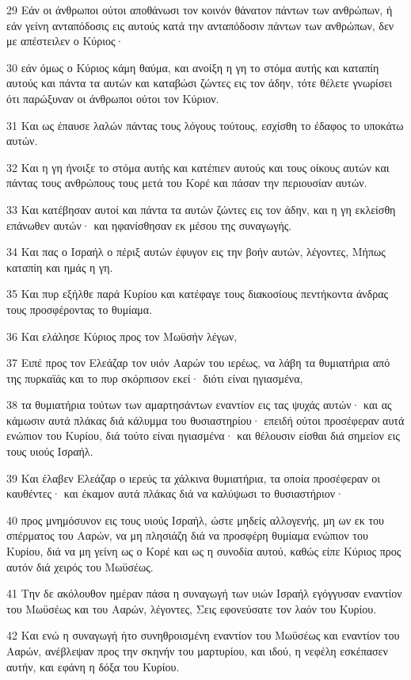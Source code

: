 \par 29 Εάν οι άνθρωποι ούτοι αποθάνωσι τον κοινόν θάνατον πάντων των ανθρώπων, ή εάν γείνη ανταπόδοσις εις αυτούς κατά την ανταπόδοσιν πάντων των ανθρώπων, δεν με απέστειλεν ο Κύριος·
\par 30 εάν όμως ο Κύριος κάμη θαύμα, και ανοίξη η γη το στόμα αυτής και καταπίη αυτούς και πάντα τα αυτών και καταβώσι ζώντες εις τον άδην, τότε θέλετε γνωρίσει ότι παρώξυναν οι άνθρωποι ούτοι τον Κύριον.
\par 31 Και ως έπαυσε λαλών πάντας τους λόγους τούτους, εσχίσθη το έδαφος το υποκάτω αυτών.
\par 32 Και η γη ήνοιξε το στόμα αυτής και κατέπιεν αυτούς και τους οίκους αυτών και πάντας τους ανθρώπους τους μετά του Κορέ και πάσαν την περιουσίαν αυτών.
\par 33 Και κατέβησαν αυτοί και πάντα τα αυτών ζώντες εις τον άδην, και η γη εκλείσθη επάνωθεν αυτών· και ηφανίσθησαν εκ μέσου της συναγωγής.
\par 34 Και πας ο Ισραήλ ο πέριξ αυτών έφυγον εις την βοήν αυτών, λέγοντες, Μήπως καταπίη και ημάς η γη.
\par 35 Και πυρ εξήλθε παρά Κυρίου και κατέφαγε τους διακοσίους πεντήκοντα άνδρας τους προσφέροντας το θυμίαμα.
\par 36 Και ελάλησε Κύριος προς τον Μωϋσήν λέγων,
\par 37 Ειπέ προς τον Ελεάζαρ τον υιόν Ααρών του ιερέως, να λάβη τα θυμιατήρια από της πυρκαϊάς και το πυρ σκόρπισον εκεί· διότι είναι ηγιασμένα,
\par 38 τα θυμιατήρια τούτων των αμαρτησάντων εναντίον εις τας ψυχάς αυτών· και ας κάμωσιν αυτά πλάκας διά κάλυμμα του θυσιαστηρίου· επειδή ούτοι προσέφεραν αυτά ενώπιον του Κυρίου, διά τούτο είναι ηγιασμένα· και θέλουσιν είσθαι διά σημείον εις τους υιούς Ισραήλ.
\par 39 Και έλαβεν Ελεάζαρ ο ιερεύς τα χάλκινα θυμιατήρια, τα οποία προσέφεραν οι καυθέντες· και έκαμον αυτά πλάκας διά να καλύψωσι το θυσιαστήριον·
\par 40 προς μνημόσυνον εις τους υιούς Ισραήλ, ώστε μηδείς αλλογενής, μη ων εκ του σπέρματος του Ααρών, να μη πλησιάζη διά να προσφέρη θυμίαμα ενώπιον του Κυρίου, διά να μη γείνη ως ο Κορέ και ως η συνοδία αυτού, καθώς είπε Κύριος προς αυτόν διά χειρός του Μωϋσέως.
\par 41 Την δε ακόλουθον ημέραν πάσα η συναγωγή των υιών Ισραήλ εγόγγυσαν εναντίον του Μωϋσέως και του Ααρών, λέγοντες, Σεις εφονεύσατε τον λαόν του Κυρίου.
\par 42 Και ενώ η συναγωγή ήτο συνηθροισμένη εναντίον του Μωϋσέως και εναντίον του Ααρών, ανέβλεψαν προς την σκηνήν του μαρτυρίου, και ιδού, η νεφέλη εσκέπασεν αυτήν, και εφάνη η δόξα του Κυρίου.
